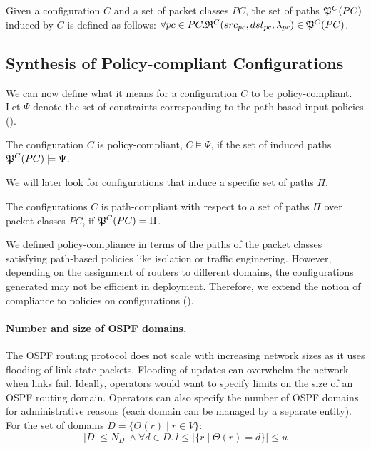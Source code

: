 \begin{definition}
Given a configuration $C$ and a set of packet classes $PC$, the set of paths
$\mathfrak{P}^C(PC)$ induced by $C$ is defined as follows: 
$\forall pc \in PC. \mathfrak{R}^C(src_{pc}, dst_{pc}, \lambda_{pc}) \in \mathfrak{P}^C(PC)$.
\end{definition}

\subsection{Synthesis of Policy-compliant Configurations}




\noindent We can now define what it means for a configuration $C$ to be policy-compliant. Let 
$\Psi$ denote the set of constraints corresponding to the 
path-based input policies (). 
\begin{definition}
	The configuration $C$ is policy-compliant,
	$C \models \Psi$, if the set of
	induced paths $\mathfrak{P}^C(PC) \models \Psi$.
\end{definition}

We will later look for configurations that induce a specific set of paths $\Pi$.  
\begin{definition}
	The configurations $C$ is path-compliant with respect to 
	a set of paths $\Pi$ over packet classes $PC$,
	if $\mathfrak{P}^C(PC)=\Pi$.
\end{definition}

We defined policy-compliance in terms of the 
paths of the packet classes satisfying path-based 
policies like isolation or traffic engineering. However,
depending on the assignment of routers to different domains,
the configurations generated may not be efficient
in deployment. Therefore, we extend the notion of 
compliance to policies on configurations 
().

\paragraph{Number and size of OSPF domains.} 
The OSPF routing protocol does not scale 
with increasing network sizes
as it uses
flooding of link-state packets. Flooding 
of updates can  
overwhelm the network when links fail. 
Ideally, operators would want to specify
limits on the size of an OSPF routing domain. 
Operators can also specify the number of OSPF domains
for administrative reasons (each domain can be
managed by a separate entity). For the  
set of domains $D = \{\Theta(r) \mid r \in V\}$:
\begin{equation}
	|D| \leq N_{D} ~\wedge \forall d \in D. ~l \leq |\{r \mid \Theta(r) = d\}| \leq u
\end{equation}

